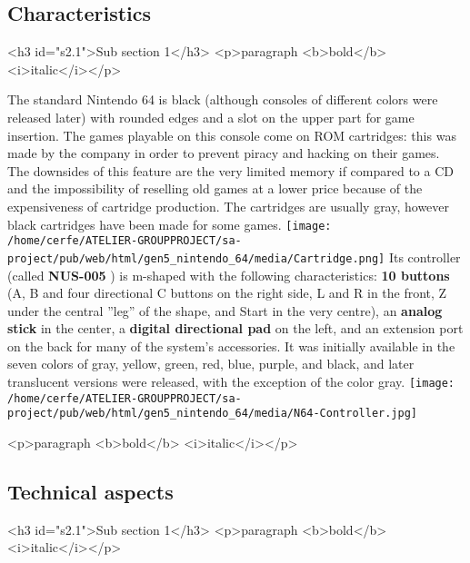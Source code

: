 \documentclass[a4paper,10pt]{book}
\begin{document}
 \subsection{Characteristics }
 <h3 id="s2.1">Sub section 1</h3>
        <p>paragraph <b>bold</b> <i>italic</i></p> 
 
          The standard Nintendo 64 is black (although consoles of different colors were released later) with rounded edges and a slot on the upper part for game insertion. The games playable on this console come on ROM cartridges: this was made by the company in order to prevent piracy and hacking on their games. 
          The downsides of this feature are the very limited memory if compared to a CD and the impossibility of reselling old games at a lower price because of the expensiveness of cartridge production. The cartridges are usually gray, however black cartridges have been made for some games. 
 \texttt{[image: /home/cerfe/ATELIER-GROUPPROJECT/sa-project/pub/web/html/gen5\_nintendo\_64/media/Cartridge.png]}
          Its controller (called  \textbf{NUS-005 } ) is m-shaped with the following characteristics:  \textbf{10 buttons }  (A, B and four directional C buttons on the right side, L and R in the front, Z under the central ''leg'' of the shape, and Start in the very centre),
          an  \textbf{analog stick }  in the center, a  \textbf{digital directional pad }  on the left, and an extension port on the back for many of the system's accessories. It was initially available in the seven colors of gray, yellow, green, red, blue, purple, and black, and later translucent versions were released, with the exception of the color gray. 
 \texttt{[image: /home/cerfe/ATELIER-GROUPPROJECT/sa-project/pub/web/html/gen5\_nintendo\_64/media/N64-Controller.jpg]}
 
 <p>paragraph <b>bold</b> <i>italic</i></p> 
 \subsection{Technical aspects }
 <h3 id="s2.1">Sub section 1</h3>
        <p>paragraph <b>bold</b> <i>italic</i></p> 
 
\end{document}
